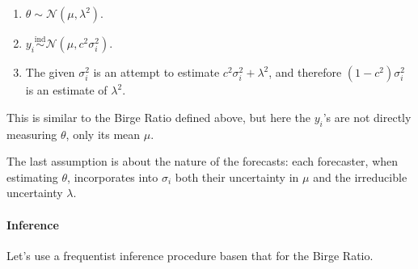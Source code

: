 \documentclass[letterpaper,12pt]{article}
\begin{document}
\begin{enumerate}
\item
  $\theta\sim \mathcal{N}(\mu,\lambda^2)$.
\item
  $y_i\overset{\mathrm{ind}}{\sim}\mathcal{N}(\mu,c^2\sigma_i^2)$.
\item
  The given $\sigma_i^2$ is an attempt to estimate $c^2\sigma_i^2+\lambda^2$, and therefore $(1-c^2)\sigma_i^2$ is an estimate of $\lambda^2$.
\end{enumerate}

This is similar to the Birge Ratio defined above, but here the $y_i$'s are not directly measuring $\theta$, only its mean $\mu$.

The last assumption is about the nature of the forecasts: each forecaster, when estimating $\theta$, incorporates into $\sigma_i$ both their uncertainty in $\mu$ and the irreducible uncertainty $\lambda$.

\paragraph{Inference}\label{inference-7}

Let's use a frequentist inference procedure basen that for the Birge Ratio.
\end{document}
